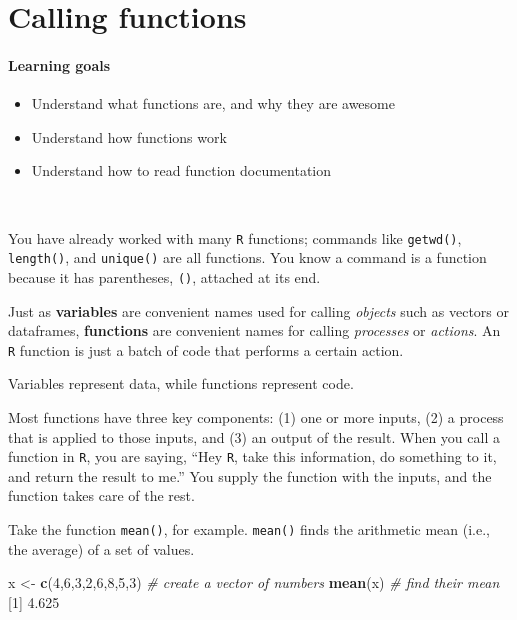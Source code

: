 \documentclass[]{book}
\newenvironment{Shaded}{\begin{snugshade}}{\end{snugshade}}
\newcommand{\CommentTok}[1]{\textcolor[rgb]{0.56,0.35,0.01}{\textit{#1}}}
\newcommand{\DecValTok}[1]{\textcolor[rgb]{0.00,0.00,0.81}{#1}}
\newcommand{\FloatTok}[1]{\textcolor[rgb]{0.00,0.00,0.81}{#1}}
\newcommand{\KeywordTok}[1]{\textcolor[rgb]{0.13,0.29,0.53}{\textbf{#1}}}
\newcommand{\NormalTok}[1]{#1}
\newcommand{\StringTok}[1]{\textcolor[rgb]{0.31,0.60,0.02}{#1}}
\providecommand{\tightlist}{%
  \setlength{\itemsep}{0pt}\setlength{\parskip}{0pt}}
\begin{document}
\hypertarget{calling_functions}{%
\chapter{Calling functions}\label{calling_functions}}

\hypertarget{learning-goals-4}{%
\subsubsection*{Learning goals}\label{learning-goals-4}}

\begin{itemize}
\tightlist
\item
  Understand what functions are, and why they are awesome
\item
  Understand how functions work
\item
  Understand how to read function documentation
\end{itemize}

~

You have already worked with many \texttt{R} functions; commands like \texttt{getwd()}, \texttt{length()}, and \texttt{unique()} are all functions. You know a command is a function because it has parentheses, \texttt{()}, attached at its end.

Just as \textbf{variables} are convenient names used for calling \emph{objects} such as vectors or dataframes, \textbf{functions} are convenient names for calling \emph{processes} or \emph{actions}. An \texttt{R} function is just a batch of code that performs a certain action.

Variables represent data, while functions represent code.

Most functions have three key components: (1) one or more inputs, (2) a process that is applied to those inputs, and (3) an output of the result. When you call a function in \texttt{R}, you are saying, ``Hey \texttt{R}, take this information, do something to it, and return the result to me.'' You supply the function with the inputs, and the function takes care of the rest.

Take the function \texttt{mean()}, for example. \texttt{mean()} finds the arithmetic mean (i.e., the average) of a set of values.

\begin{Shaded}
\begin{Highlighting}[]
\NormalTok{x <-}\StringTok{ }\KeywordTok{c}\NormalTok{(}\DecValTok{4}\NormalTok{,}\DecValTok{6}\NormalTok{,}\DecValTok{3}\NormalTok{,}\DecValTok{2}\NormalTok{,}\DecValTok{6}\NormalTok{,}\DecValTok{8}\NormalTok{,}\DecValTok{5}\NormalTok{,}\DecValTok{3}\NormalTok{) }\CommentTok{# create a vector of numbers}
\KeywordTok{mean}\NormalTok{(x) }\CommentTok{# find their mean}
\NormalTok{[}\DecValTok{1}\NormalTok{] }\FloatTok{4.625}
\end{Highlighting}
\end{Shaded}
\end{document}
